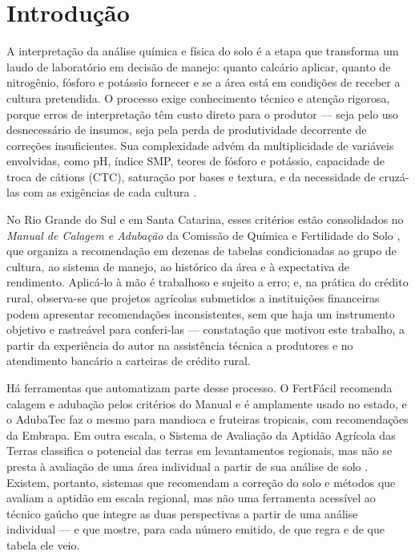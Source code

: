\section{Introdução}\label{sec:intro}

A interpretação da análise química e física do solo é a etapa que transforma um laudo de
laboratório em decisão de manejo: quanto calcário aplicar, quanto de nitrogênio, fósforo e
potássio fornecer e se a área está em condições de receber a cultura pretendida. O processo
exige conhecimento técnico e atenção rigorosa, porque erros de interpretação têm custo direto
para o produtor --- seja pelo uso desnecessário de insumos, seja pela perda de produtividade
decorrente de correções insuficientes. Sua complexidade advém da multiplicidade de variáveis
envolvidas, como pH, índice SMP, teores de fósforo e potássio, capacidade de troca de cátions
(CTC), saturação por bases e textura, e da necessidade de cruzá-las com as exigências de cada
cultura \citep{Donagema2011, ManualCalagem2016}.

No Rio Grande do Sul e em Santa Catarina, esses critérios estão consolidados no \textit{Manual
de Calagem e Adubação} da Comissão de Química e Fertilidade do Solo \citep{ManualCalagem2016},
que organiza a recomendação em dezenas de tabelas condicionadas ao grupo de cultura, ao sistema
de manejo, ao histórico da área e à expectativa de rendimento. Aplicá-lo à mão é trabalhoso e
sujeito a erro; e, na prática do crédito rural, observa-se que projetos agrícolas submetidos a
instituições financeiras podem apresentar recomendações inconsistentes, sem que haja um
instrumento objetivo e rastreável para conferi-las --- constatação que motivou este trabalho,
a partir da experiência do autor na assistência técnica a produtores e no atendimento bancário
a carteiras de crédito rural.

Há ferramentas que automatizam parte desse processo. O FertFácil \citep{Tiecher2016, MaisSoja2026}
recomenda calagem e adubação pelos critérios do Manual e é amplamente usado no estado, e o
AdubaTec \citep{AdubaTec2021} faz o mesmo para mandioca e fruteiras tropicais, com recomendações da Embrapa. Em outra escala, o Sistema
de Avaliação da Aptidão Agrícola das Terras \citep{RamalhoFilhoBeek1995, EmbrapaAptidao2025}
classifica o potencial das terras em levantamentos regionais, mas não se presta à avaliação
de uma área individual a partir de sua análise de solo \citep{Hofig2015}. Existem, portanto,
sistemas que recomendam a correção do solo e métodos que avaliam a aptidão em escala regional,
mas não uma ferramenta acessível ao técnico gaúcho que integre as duas perspectivas a partir de
uma análise individual --- e que mostre, para cada número emitido, de que regra e de que
tabela ele veio.

